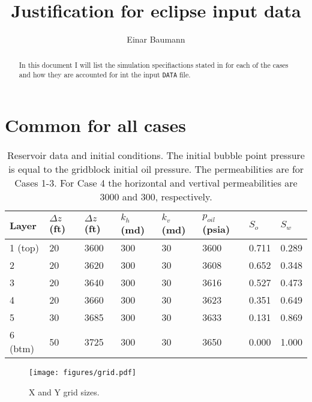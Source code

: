 


\author{Einar Baumann}
\title{Justification for eclipse input data}


\maketitle

\begin{abstract}
  In this document I will list the simulation specifiactions stated in \cite{spe7-1991} for each of the cases and how they are accounted for int the input \texttt{DATA} file.
\end{abstract}


\section{Common for all cases} %
\label{sec:common_for_all_cases}

\begin{table}[H]
  \centering
  \caption{Reservoir data and initial conditions. The initial bubble point pressure is equal to the gridblock initial oil pressure. The permeabilities are for Cases 1-3. For Case 4 the horizontal and vertival permeabilities are 3000 and 300, respectively.}
  \footnotesize
  \label{tab:res_data_initial}
  \begin{tabularx}{1.0\textwidth}{XXXXXXXX}
    \toprule
    Layer & $\Delta z$ {\tiny (ft)} & $\Delta z$ {\tiny (ft)} & $k_{h}$ {\tiny (md)} & $k_{v}$ {\tiny (md)} & $p_{oil}$ {\tiny (psia)} & $S_o$ & $S_w$ \\
    \midrule
    1 (top) & 20 & 3600 & 300 & 30 & 3600 & 0.711 & 0.289 \\
    2       & 20 & 3620 & 300 & 30 & 3608 & 0.652 & 0.348 \\
    3       & 20 & 3640 & 300 & 30 & 3616 & 0.527 & 0.473 \\
    4       & 20 & 3660 & 300 & 30 & 3623 & 0.351 & 0.649 \\
    5       & 30 & 3685 & 300 & 30 & 3633 & 0.131 & 0.869 \\
    6 (btm) & 50 & 3725 & 300 & 30 & 3650 & 0.000 & 1.000 \\
    \bottomrule
  \end{tabularx}
\end{table}

\begin{figure}[htbp]
  \centering
  \texttt{[image: figures/grid.pdf]}
  \caption{X and Y grid sizes.}
  \label{fig:grid}
\end{figure}


